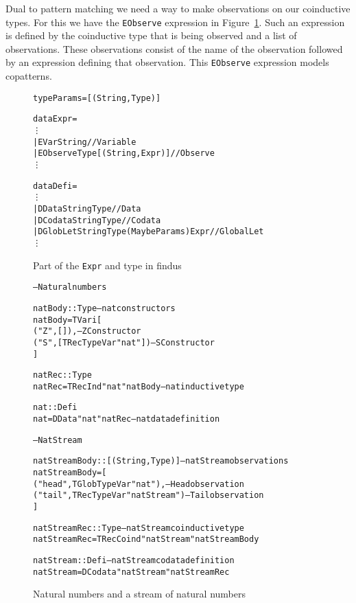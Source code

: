 Dual to pattern matching we need a way to make observations on our coinductive types. For this we have the \texttt{EObserve} expression in Figure~\ref{fig:expr}. Such an expression is defined by the coinductive type that is being observed and a list of observations. These observations consist of the name of the observation followed by an expression defining that observation. This \texttt{EObserve} expression models copatterns.

\begin{figure}
\begin{alltt}
type Params = [(String, Type)]

data Expr =
  \vdots
  | EVar String                              // Variable
  | EObserve Type [(String, Expr)]           // Observe
  \vdots

data Defi =
  \vdots
  | DData String Type                        // Data
  | DCodata String Type                      // Codata
  | DGlobLet String Type (Maybe Params) Expr // Global Let
  \vdots
\end{alltt}
\caption{Part of the \texttt{Expr} and  type in findus}
\label{fig:expr}
\end{figure}

\begin{figure}
\begin{alltt}
-- Natural numbers

natBody :: Type                         -- nat constructors
natBody = TVari [
            ("Z", []),                  -- Z Constructor
            ("S", [TRecTypeVar "nat"])  -- S Constructor
          ]

natRec :: Type
natRec = TRecInd "nat" natBody          -- nat inductive type

nat :: Defi
nat = DData "nat" natRec                -- nat data definition

-- Nat Stream

natStreamBody :: [(String, Type)]          -- natStream observations
natStreamBody = [
                  ("head", TGlobTypeVar "nat"),     -- Head observation
                  ("tail", TRecTypeVar "natStream") -- Tail observation
                ]

natStreamRec :: Type                    -- natStream coinductive type
natStreamRec = TRecCoind "natStream" natStreamBody  

natStream :: Defi                       -- natStream codata definition
natStream = DCodata "natStream" natStreamRec  
\end{alltt}
\caption{Natural numbers and a stream of natural numbers}
\label{fig:natandstream}
\end{figure}

